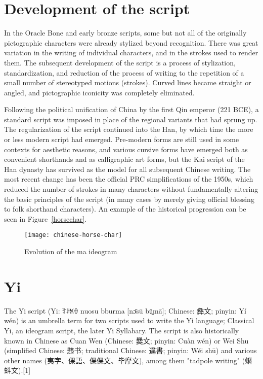 \section{Development of the script}

In the Oracle Bone and early bronze scripts, some but not all of the originally pictographic
characters were already stylized beyond recognition. There was great variation in the writing
of individual characters, and in the strokes used to render them. The subsequent development
of the script is a process of stylization, standardization, and reduction of the process of writing
to the repetition of a small number of stereotyped motions (strokes). Curved lines became
straight or angled, and pictographic iconicity was completely eliminated. 


Following the political unification of China by the first Qin emperor (221 BCE), a standard
script was imposed in place of the regional variants that had sprung up. The regularization of
the script continued into the Han, by which time the more or less modern script had emerged.
Pre-modern forms are still used in some contexts for aesthetic reasons, and various cursive
forms have emerged both as convenient shorthands and as calligraphic art forms, but the Kai
script of the Han dynasty has survived as the model for all subsequent Chinese writing. The
most recent change has been the official PRC simplifications of the 1950s, which reduced the
number of strokes in many characters without fundamentally altering the basic principles
of the script (in many cases by merely giving official blessing to folk shorthand characters).
An example of the historical progression can be seen in Figure~\ref{horsechar}. 

\begin{figure}[htbp]
\texttt{[image: chinese-horse-char]}
\caption{Evolution of the ma ideogram}
\label{fig:horsechar}
\end{figure}






\section{Yi}
\label{s:yi}

The Yi script (Yi: {\yi ꆈꌠꁱꂷ} nuosu bburma [nɔ̄sū bū̠mā]; Chinese: {\cjk 彝文}; pinyin: Yí wén) is an umbrella term for two scripts used to write the Yi language; Classical Yi, an ideogram script, the later Yi Syllabary. The script is also historically known in Chinese as Cuan Wen (Chinese: {\cjk 爨文}; pinyin: Cuàn wén) or Wei Shu (simplified Chinese: {\cjk 韪书}; traditional Chinese: {\cjk 違書}; pinyin: Wéi shū) and various other names ({\cjk 夷字、倮語、倮倮文、毕摩文}), among them "tadpole writing" ({\cjk 蝌蚪文}).[1]

